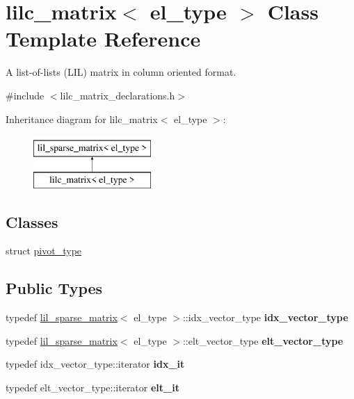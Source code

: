 \hypertarget{classlilc__matrix}{}\section{lilc\+\_\+matrix$<$ el\+\_\+type $>$ Class Template Reference}
\label{classlilc__matrix}


A list-\/of-\/lists (L\+IL) matrix in column oriented format.  




{\ttfamily \#include $<$lilc\+\_\+matrix\+\_\+declarations.\+h$>$}

Inheritance diagram for lilc\+\_\+matrix$<$ el\+\_\+type $>$\+:\begin{figure}[H]
\begin{center}
\leavevmode
\includegraphics[height=2.000000cm]{classlilc__matrix}
\end{center}
\end{figure}
\subsection*{Classes}
\begin{DoxyCompactItemize}
\item 
struct \hyperlink{structlilc__matrix_1_1pivot__type}{pivot\+\_\+type}
\end{DoxyCompactItemize}
\subsection*{Public Types}
\begin{DoxyCompactItemize}
\item 
typedef \hyperlink{classlil__sparse__matrix}{lil\+\_\+sparse\+\_\+matrix}$<$ el\+\_\+type $>$\+::idx\+\_\+vector\+\_\+type {\bfseries idx\+\_\+vector\+\_\+type}\hypertarget{classlilc__matrix_a83c70482c28275881562ee3937b5f591}{}\label{classlilc__matrix_a83c70482c28275881562ee3937b5f591}

\item 
typedef \hyperlink{classlil__sparse__matrix}{lil\+\_\+sparse\+\_\+matrix}$<$ el\+\_\+type $>$\+::elt\+\_\+vector\+\_\+type {\bfseries elt\+\_\+vector\+\_\+type}\hypertarget{classlilc__matrix_aa5a7b6e31a6c9ebf2ea3a898fe646af6}{}\label{classlilc__matrix_aa5a7b6e31a6c9ebf2ea3a898fe646af6}

\item 
typedef idx\+\_\+vector\+\_\+type\+::iterator {\bfseries idx\+\_\+it}\hypertarget{classlilc__matrix_a8cd399b5bc0ef50dcf5a59a671e32248}{}\label{classlilc__matrix_a8cd399b5bc0ef50dcf5a59a671e32248}

\item 
typedef elt\+\_\+vector\+\_\+type\+::iterator {\bfseries elt\+\_\+it}\hypertarget{classlilc__matrix_ad34c37b7095e283a7e5d7160fe26fd1b}{}\label{classlilc__matrix_ad34c37b7095e283a7e5d7160fe26fd1b}

\end{DoxyCompactItemize}
